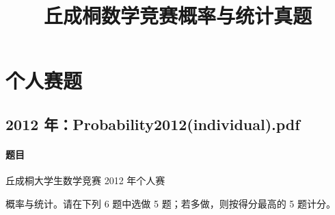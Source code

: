 \documentclass[UTF8,12pt]{ctexart}
\title{丘成桐数学竞赛概率与统计真题}
\author{}
\date{}
\begin{document}
\maketitle
\tableofcontents
\newpage

\section{个人赛题}
\subsection{2012 年：Probability2012(individual).pdf}
\paragraph{题目}
丘成桐大学生数学竞赛 2012 年个人赛

概率与统计。请在下列 6 题中选做 5 题；若多做，则按得分最高的 5 题计分。
\end{document}
